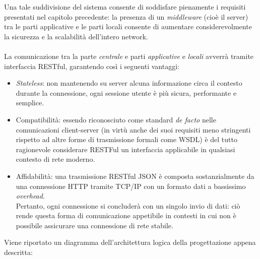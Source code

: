 \documentclass[12pt]{article}
\begin{document}
Una tale suddivisione del sistema consente di soddisfare pienamente i requisiti presentati nel capitolo precedente: la presenza di un \textit{middleware} (cioè il server)  tra le parti applicative e le parti locali consente di aumentare considerevolmente la sicurezza e la scalabilità dell'intero network.\\\\
La comunicazione tra la parte \textit{centrale} e parti \textit{applicative} e \textit{locali} avverrà tramite interfaccia RESTful, garantendo così i seguenti vantaggi:
\begin{itemize}
	\item \textit{Stateless}: non mantenendo su server alcuna informazione circa il contesto durante la connessione, ogni sessione utente è più sicura, performante e semplice.
	\item Compatibilità: essendo riconosciuto come standard \textit{de facto} nelle comunicazioni client-server (in virtù anche dei suoi requisiti meno stringenti rispetto ad altre forme di trasmissione formali come WSDL) è del tutto ragionevole considerare RESTFul un interfaccia applicabile in qualsiasi contesto di rete moderno.
	\item Affidabilità: una trasmissione RESTful JSON è composta sostanzialmente da una connessione HTTP tramite TCP/IP con un formato dati a bassissimo \textit{overhead}.\\
	Pertanto, ogni connessione si concluderà con un singolo invio di dati:  ciò rende questa forma di comunicazione appetibile in contesti in cui non è possibile assicurare una connessione di rete stabile.
\end{itemize}
Viene riportato un diagramma dell'architettura logica della progettazione appena descritta:
\end{document}
